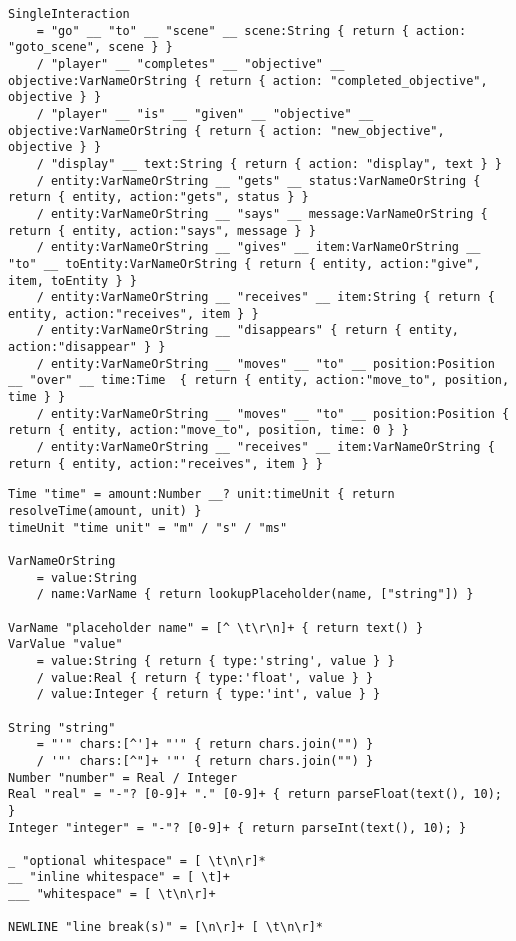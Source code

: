 \begin{lstlisting}[language=PEG, label={app:pca:grammar3}, caption={The pca Language Grammar}]
SingleInteraction
    = "go" __ "to" __ "scene" __ scene:String { return { action: "goto_scene", scene } }
    / "player" __ "completes" __ "objective" __ objective:VarNameOrString { return { action: "completed_objective",  objective } }
    / "player" __ "is" __ "given" __ "objective" __ objective:VarNameOrString { return { action: "new_objective",  objective } }
	/ "display" __ text:String { return { action: "display", text } }
	/ entity:VarNameOrString __ "gets" __ status:VarNameOrString { return { entity, action:"gets", status } }
	/ entity:VarNameOrString __ "says" __ message:VarNameOrString { return { entity, action:"says", message } }
	/ entity:VarNameOrString __ "gives" __ item:VarNameOrString __ "to" __ toEntity:VarNameOrString { return { entity, action:"give", item, toEntity } }
	/ entity:VarNameOrString __ "receives" __ item:String { return { entity, action:"receives", item } }
	/ entity:VarNameOrString __ "disappears" { return { entity, action:"disappear" } }
    / entity:VarNameOrString __ "moves" __ "to" __ position:Position __ "over" __ time:Time  { return { entity, action:"move_to", position, time } }
	/ entity:VarNameOrString __ "moves" __ "to" __ position:Position { return { entity, action:"move_to", position, time: 0 } }
	/ entity:VarNameOrString __ "receives" __ item:VarNameOrString { return { entity, action:"receives", item } }
\end{lstlisting}
\newpage


\begin{lstlisting}[language=PEG, label={app:pca:grammar}, caption={The pca Language Grammar}]
Time "time" = amount:Number __? unit:timeUnit { return resolveTime(amount, unit) }
timeUnit "time unit" = "m" / "s" / "ms"

VarNameOrString
	= value:String
    / name:VarName { return lookupPlaceholder(name, ["string"]) }

VarName "placeholder name" = [^ \t\r\n]+ { return text() }
VarValue "value"
	= value:String { return { type:'string', value } }
	/ value:Real { return { type:'float', value } }
	/ value:Integer { return { type:'int', value } }

String "string"
	= "'" chars:[^']+ "'" { return chars.join("") }
	/ '"' chars:[^"]+ '"' { return chars.join("") }
Number "number" = Real / Integer
Real "real" = "-"? [0-9]+ "." [0-9]+ { return parseFloat(text(), 10); }
Integer "integer" = "-"? [0-9]+ { return parseInt(text(), 10); }

_ "optional whitespace"	= [ \t\n\r]*
__ "inline whitespace" = [ \t]+
___ "whitespace" = [ \t\n\r]+

NEWLINE "line break(s)" = [\n\r]+ [ \t\n\r]*
\end{lstlisting}
\newpage